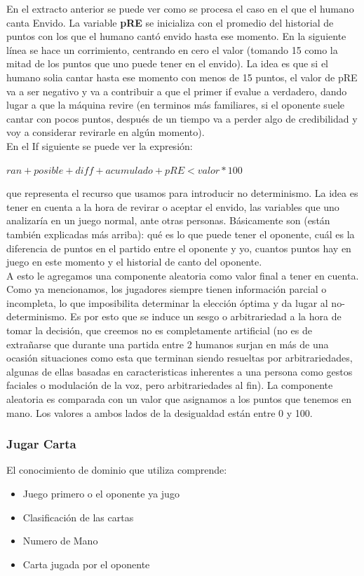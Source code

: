\documentclass[12pt,a4paper]{article}
\begin{document}
\noindent En el extracto anterior se puede ver como se procesa el caso en el que el humano canta Envido.
La variable \textbf{pRE} se inicializa con el promedio del historial de puntos con los que el humano
cant\'o envido hasta ese momento. En la siguiente l\'inea se hace un corrimiento, centrando en cero el valor
(tomando 15 como la mitad de los puntos que uno puede tener en el envido). La idea es que si el humano
solia cantar hasta ese momento con menos de 15 puntos, el valor de pRE va a ser negativo y va a contribuir
a que el primer if evalue a verdadero, dando lugar a que la m\'aquina revire (en terminos m\'as familiares,
si el oponente suele cantar con pocos puntos, despu\'es de un tiempo va a perder algo de credibilidad y voy 
a considerar revirarle en alg\'un momento).\\
\noindent En el If siguiente se puede ver la expresi\'on: 
\begin{center}
	$ ran + posible + diff + acumulado + pRE  <  valor  * 100 $
\end{center}
que representa el recurso que usamos para introducir no determinismo. La idea es tener en cuenta a la hora de revirar
o aceptar el envido, las variables que uno analizar\'ia en un juego normal, ante otras personas. B\'asicamente son 
(est\'an tambi\'en explicadas m\'as arriba): qu\'e es lo que puede tener el oponente, cu\'al es la diferencia de puntos
en el partido entre el oponente y yo, cuantos puntos hay en juego en este momento y el historial de canto del oponente.\\
\noindent A esto le agregamos una componente aleatoria como valor final a tener en cuenta.
Como ya mencionamos, los jugadores siempre tienen informaci\'on parcial o incompleta, lo que imposibilita
determinar la elecci\'on \'optima y da lugar al no-determinismo. Es por esto que se induce un sesgo o arbitrariedad
a la hora de tomar la decisi\'on, que creemos no es completamente artificial (no es de extra\~narse que durante una partida entre
2 humanos surjan en m\'as de una ocasi\'on situaciones como esta que terminan siendo resueltas por arbitrariedades, algunas de
ellas basadas en caracteristicas inherentes a una persona como gestos faciales o modulaci\'on de la voz, pero arbitrariedades
al fin). 
La componente aleatoria es comparada con un valor que asignamos a los puntos que tenemos en mano. 
Los valores a ambos lados de la desigualdad est\'an entre 0 y 100.



\subsubsection{Jugar Carta}
El conocimiento de dominio que utiliza comprende:
\begin{itemize}
\item Juego primero o  el oponente ya jugo
\item Clasificaci\'on de las cartas
\item Numero de Mano
\item Carta jugada por el oponente
\end{itemize}
\end{document}

